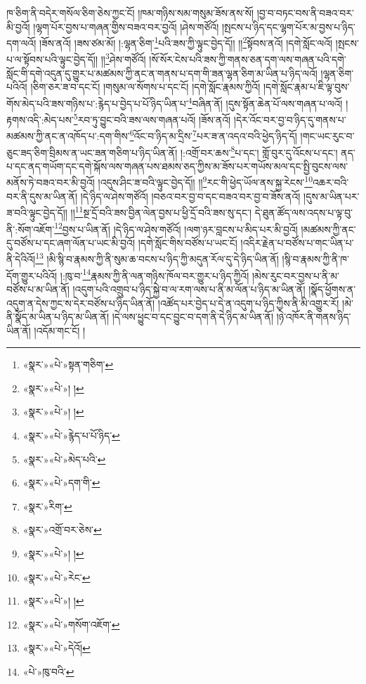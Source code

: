 ཁ་ཅིག་ནི་བདེར་གསོལ་ཅིག་ཅེས་ཀྱང་ངོ། །ཁམ་གཉིས་སམ་གསུམ་ཟོས་ནས་སོ། །བྱ་བ་བཏང་བས་ནི་བཟའ་བར་མི་བྱའོ། །ལྷག་པོར་བྱས་པ་གཞན་གྱིས་བཟའ་བར་བྱའོ། །ཤེས་གཙོའོ། །སྤངས་པ་ཉིད་དང་ལྷག་པོར་མ་བྱས་པ་ཉིད་དག་ལའོ། །ཟོས་ནའོ། །ཟས་ཙམ་མོ། །:ལྷན་ཅིག་\footnote{«སྣར་»«པེ་»སྟན་གཅིག་}པའི་ཟས་ཀྱི་ལྟུང་བྱེད་དོ།། །།\footnote{«སྣར་»«པེ་»། །}སྟོབས་ནའོ། །དགེ་སློང་ལའོ། །སྤངས་པ་ལ་སྟོབས་པའི་ལྟུང་བྱེད་དོ།། །།\footnote{«སྣར་»«པེ་»། །}ཤེས་གཙོའོ། །སོ་སོར་ངེས་པའི་ཟས་ཀྱི་གནས་ཅན་དག་ལས་གཞན་པའི་དགེ་སློང་གི་དགེ་འདུན་དུ་གྱུར་པ་མཚམས་ཀྱི་ནང་ན་གནས་པ་དག་གི་ཟན་ལྷན་ཅིག་མ་ཡིན་པ་ཉིད་ལའོ། །ལྷན་ཅིག་པའིའོ། །ཅིག་ཅར་ཟ་བ་དང་ངོ། །གསུམ་ལ་སོགས་པ་དང་ངོ། །དགེ་སློང་རྣམས་ཀྱིའོ། །དགེ་སློང་རྣམ་པ་ཇི་ལྟ་བུས་གོས་མེད་པའི་ཟས་གཉིས་པ་:རྙེད་པ་བྱེད་པ་པོ་ཉིད་ཡིན་པ་\footnote{«སྣར་»«པེ་»རྙེད་པ་པོ་ཉིད་}བཞིན་ནོ། །དུས་སྟོན་ཆེན་པོ་ལས་གཞན་པ་ལའོ། །རྟགས་འདི་:མེད་པས་\footnote{«སྣར་»«པེ་»མེད་པའི་}རབ་ཏུ་བྱུང་བའི་ཟས་ལས་གཞན་པའོ། །ཟོས་ནའོ། །དེར་འོང་བར་བྱ་བ་ཉིད་དུ་གནས་པ་མཚམས་ཀྱི་ནང་ན་འཁོད་པ་:དག་གིས་\footnote{«སྣར་»«པེ་»དག་གི་}འོང་བ་ཉིད་མ་དྲིས་\footnote{«སྣར་»རིག་}པར་ཟ་ན་འདའ་བའི་ཕྱེད་ཉིད་དོ། །གང་ཡང་རུང་བ་ཅུང་ཟད་ཅིག་བྲིམས་ན་ཡང་ཟན་གཅིག་པ་ཉིད་ཡིན་ནོ། །:འགྲོ་བར་ཆས་\footnote{«སྣར་»འགྲོ་བར་ཅེས་}པ་དང་། གློ་བུར་དུ་འོངས་པ་དང་། ནད་པ་དང་ནད་གཡོག་དང་དགེ་སྐོས་ལས་གཞན་པས་ཐམས་ཅད་ཀྱིས་མ་ཟོས་པར་གཡོས་མལ་དང་སྤྱི་བུངས་ལས་མནོས་ཏེ་བཟའ་བར་མི་བྱའོ། །འདུས་ཤིང་ཟ་བའི་ལྟུང་བྱེད་དོ།། །།\footnote{«སྣར་»«པེ་»། །}རང་གི་ཕྱེད་ཡོལ་ནས་སྐྱ་རེངས་\footnote{«སྣར་»«པེ་»རེང་}འཆར་བའི་བར་ནི་དུས་མ་ཡིན་ནོ། །དེ་ཉིད་ལ་ཤེས་གཙོའོ། །བཅའ་བར་བྱ་བ་དང་བཟའ་བར་བྱ་བ་ཟོས་ནའོ། །དུས་མ་ཡིན་པར་ཟ་བའི་ལྟུང་བྱེད་དོ།། །།\footnote{«སྣར་»«པེ་»། །}སྔ་དྲོ་བའི་ཟས་བྱིན་ལེན་བྱས་པ་ཕྱི་དྲོ་བའི་ཟས་སུ་དང་། དེ་ཐུན་ཚོད་ལས་འདས་པ་ལྟ་བུ་ནི་:སོག་འཇོག་\footnote{«སྣར་»«པེ་»གསོག་འཇོག་}བྱས་པ་ཡིན་ནོ། །དེ་ཉིད་ལ་ཤེས་གཙོའོ། །ལག་ཉར་བླངས་པ་མིད་པར་མི་བྱའོ། །མཚམས་ཀྱི་ནང་དུ་བཙོས་པ་དང་ཞག་ལོན་པ་ཡང་མི་བྱའོ། །དགེ་སློང་གིས་བཙོས་པ་ཡང་ངོ། །འདིར་རྗེན་པ་བཙོས་པ་གང་ཡིན་པ་ནི་དེའིའོ།\footnote{«སྣར་»«པེ་»དེའོ།} །མི་སྙི་བ་རྣམས་ཀྱི་ནི་སུམ་ཆ་བངས་པ་ཉིད་ཀྱི་མདུན་རོལ་དུ་དེ་ཉིད་ཡིན་ནོ། །སྙི་བ་རྣམས་ཀྱི་ནི་ཁ་དོག་གྱུར་པའིའོ། །:ཁུ་བ་\footnote{«པེ་»ཁུ་བའི་}རྣམས་ཀྱི་ནི་ལན་གཉིས་ཁོལ་བར་གྱུར་པ་ཉིད་ཀྱིའོ། །མེས་རུང་བར་བྱས་པ་ནི་མ་བཙོས་པ་མ་ཡིན་ནོ། །འདུག་པའི་འགྲུབ་པ་ཉིད་སྐྱེ་བ་ལ་རག་ལས་པ་ནི་མ་ལོན་པ་ཉིད་མ་ཡིན་ནོ། །སྣོད་ཕྱོགས་ན་འདུག་ན་དེས་ཀྱང་ས་དེར་བཙོས་པ་ཉིད་ཡིན་ནོ། །འཚོད་པར་བྱེད་པ་དེ་ན་འདུག་པ་ཉིད་ཀྱིས་ནི་མི་འགྱུར་རོ། །མེ་ནི་སྣོད་མ་ཡིན་པ་ཉིད་མ་ཡིན་ནོ། །དེ་ལས་ཕྱུང་བ་དང་བྱུང་བ་དག་ནི་དེ་ཉིད་མ་ཡིན་ནོ། །ཉེ་འཁོར་ནི་གནས་ཉིད་ཡིན་ནོ། །འདོམ་གང་ངོ། །
